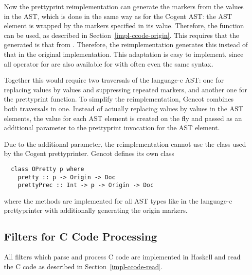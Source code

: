 Now the prettyprint reimplementation can generate the markers from the  values in the AST, which is done
in the same way as for the Cogent AST: the AST element is wrapped by the markers specified in its  value.
Therefore, the function  can be used, as described in Section~\ref{impl-ccode-origin}. This requires 
that the generated  is that from . Therefore, the reimplementation
generates this  instead of that in the original implementation. This adaptation is easy to implement,
since all operator for  are also available for 
 with often even the same syntax.

Together this would require two traversals of the language-c AST: one for replacing  values by 
 values and suppressing repeated markers, and another one for the prettyprint function. To simplify
the reimplementation, Gencot combines both traversals in one. Instead of actually replacing  values
by  values in the AST elements, the  value for each AST element is created on the fly 
and passed as an additional parameter to the prettyprint invocation for the AST element.

Due to the additional  parameter, the reimplementation cannot use the class  used 
by the Cogent prettyprinter. Gencot defines its own class 
\begin{verbatim}
  class OPretty p where
    pretty :: p -> Origin -> Doc
    prettyPrec :: Int -> p -> Origin -> Doc
\end{verbatim}
where the methods are implemented for all AST types like in the language-c prettyprinter with additionally
generating the origin markers.

\subsection{Filters for C Code Processing}
\label{impl-ccode-filters}

All filters which parse and process C code are implemented in Haskell and read the
C code as described in Section~\ref{impl-ccode-read}.

